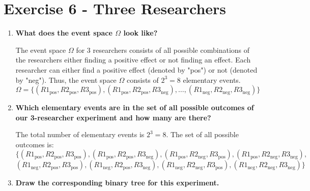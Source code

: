 \documentclass[a4paper, 12pt]{article}
\begin{document}
\section*{Exercise 6 - Three Researchers}

\begin{enumerate}
    \item \textbf{What does the event space $\Omega$ look like?}
    
    The event space $\Omega$ for 3 researchers consists of all possible combinations of the researchers either finding a positive effect or not finding an effect. Each researcher can either find a positive effect (denoted by "pos") or not (denoted by "neg"). Thus, the event space $\Omega$ consists of $2^3 = 8$ elementary events.
    \[
    \Omega = \{(R1_{\text{pos}}, R2_{\text{pos}}, R3_{\text{pos}}), (R1_{\text{pos}}, R2_{\text{pos}}, R3_{\text{neg}}), \dots, (R1_{\text{neg}}, R2_{\text{neg}}, R3_{\text{neg}})\}
    \]
  
    \item \textbf{Which elementary events are in the set of all possible outcomes of our 3-researcher experiment and how many are there?}
    
    The total number of elementary events is $2^3 = 8$. The set of all possible outcomes is:
    \[
    \{(R1_{\text{pos}}, R2_{\text{pos}}, R3_{\text{pos}}), (R1_{\text{pos}}, R2_{\text{pos}}, R3_{\text{neg}}), (R1_{\text{pos}}, R2_{\text{neg}}, R3_{\text{pos}}), (R1_{\text{pos}}, R2_{\text{neg}}, R3_{\text{neg}}),
    \]
    \[
    (R1_{\text{neg}}, R2_{\text{pos}}, R3_{\text{pos}}), (R1_{\text{neg}}, R2_{\text{pos}}, R3_{\text{neg}}), (R1_{\text{neg}}, R2_{\text{neg}}, R3_{\text{pos}}), (R1_{\text{neg}}, R2_{\text{neg}}, R3_{\text{neg}})\}
    \]
    
    \item \textbf{Draw the corresponding binary tree for this experiment.}
    


\end{enumerate}
\end{document}
